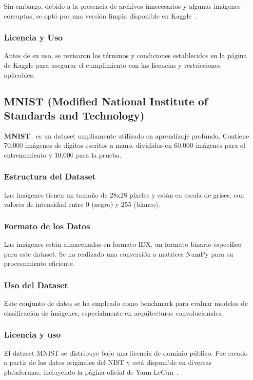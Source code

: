Sin embargo, debido a la presencia de archivos innecesarios y algunas imágenes corruptas, se optó por una versión
limpia disponible en Kaggle~\cite{noauthor_cleaned_nodate}.

\subsubsection{Licencia y Uso}
Antes de su uso, se revisaron los términos y condiciones establecidos en la página de Kaggle para asegurar el
cumplimiento con las licencias y restricciones aplicables.

\subsection{MNIST (Modified National Institute of Standards and Technology)}\label{subsec:mnist}
\textbf{MNIST}~\cite{noauthor_mnist_nodate} es un dataset ampliamente utilizado en aprendizaje profundo.
Contiene 70,000 imágenes de dígitos escritos a mano, divididas en 60,000 imágenes para el entrenamiento y 10,000 para
la prueba.

\subsubsection{Estructura del Dataset}
Las imágenes tienen un tamaño de 28x28 píxeles y están en escala de grises, con valores de intensidad entre 0 (negro) y
255 (blanco).

\subsubsection{Formato de los Datos}
Las imágenes están almacenadas en formato IDX, un formato binario específico para este dataset.
Se ha realizado una conversión a matrices NumPy para su procesamiento eficiente.

\subsubsection{Uso del Dataset}
Este conjunto de datos se ha empleado como benchmark para evaluar modelos de clasificación de imágenes, especialmente
en arquitecturas convolucionales.

\subsubsection{Licencia y uso}
El dataset MNIST se distribuye bajo una licencia de dominio público.
Fue creado a partir de los datos originales del NIST y está disponible en diversas plataformas, incluyendo la página
oficial de Yann LeCun~\cite{lecun_yann_nodate}.


